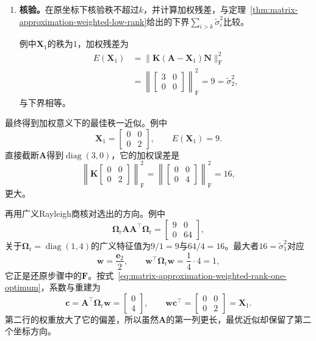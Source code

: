 \begin{enumerate}
 \item \textbf{核验。}在原坐标下核验秩不超过$k$，并计算加权残差，与定理~\ref{thm:matrix-approximation-weighted-low-rank}给出的下界$\sum_{i>k}\tilde\sigma_i^2$比较。

 例中$\bm X_1$的秩为$1$，加权残差为
 \[
  \begin{aligned}
  E(\bm X_1)&=\bigl\lVert\bm K(\bm A-\bm X_1)\bm N\bigr\rVert_{\mathrm F}^2\\
  &=\left\lVert\begin{bmatrix}3&0\\0&0\end{bmatrix}\right\rVert_{\mathrm F}^2=9=\tilde\sigma_2^2 ,
  \end{aligned}
 \]
 与下界相等。
\end{enumerate}

最终得到加权意义下的最佳秩一近似。例中
\[
 \bm X_1=\begin{bmatrix}0&0\\0&2\end{bmatrix},\qquad E(\bm X_1)=9 .
\]
直接截断$\bm A$得到$\operatorname{diag}(3,0)$，它的加权误差是
\[
 \left\lVert\bm K\begin{bmatrix}0&0\\0&2\end{bmatrix}\right\rVert_{\mathrm F}^2
 =\left\lVert\begin{bmatrix}0&0\\0&4\end{bmatrix}\right\rVert_{\mathrm F}^2=16 ,
\]
更大。

再用广义Rayleigh商核对选出的方向。例中
\[
 \bm\Omega_{\mathrm r}\bm A\bm A^\top\bm\Omega_{\mathrm r}=\begin{bmatrix}9&0\\0&64\end{bmatrix},
\]
关于$\bm\Omega_{\mathrm r}=\operatorname{diag}(1,4)$的广义特征值为$9/1=9$与$64/4=16$。最大者$16=\tilde\sigma_1^2$对应
\[
 \bm w=\frac{\bm e_2}{2},\qquad \bm w^\top\bm\Omega_{\mathrm r}\bm w=\frac14\cdot4=1 ,
\]
它正是还原步骤中的$\bm F$。按式~\eqref{eq:matrix-approximation-weighted-rank-one-optimum}，系数与重建为
\[
 \bm c=\bm A^\top\bm\Omega_{\mathrm r}\bm w=\begin{bmatrix}0\\4\end{bmatrix},\qquad
 \bm w\bm c^\top=\begin{bmatrix}0&0\\0&2\end{bmatrix}=\bm X_1 .
\]
第二行的权重放大了它的偏差，所以虽然$\bm A$的第一列更长，最优近似却保留了第二个坐标方向。

